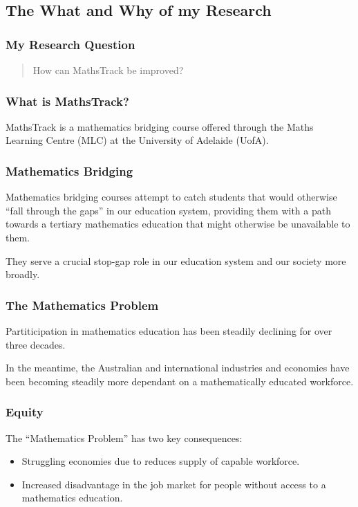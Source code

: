 \documentclass[14pt]{beamer}
\begin{document}
\subsection{The What and Why of my Research}

\begin{frame}
\frametitle{My Research Question}
\begin{quote}
	How can MathsTrack be improved?
\end{quote}
\end{frame}

\begin{frame}
\frametitle{What is MathsTrack?}
MathsTrack is a mathematics bridging course offered through the Maths Learning Centre (MLC) at the University of Adelaide (UofA).
\end{frame}

\begin{frame}
\frametitle{Mathematics Bridging}
Mathematics bridging courses attempt to catch students that would otherwise ``fall through the gaps'' in our education system, providing them with a path towards a tertiary mathematics education that might otherwise be unavailable to them.

They serve a crucial stop-gap role in our education system and our society more broadly.
\end{frame}

\begin{frame}
\frametitle{The Mathematics Problem}
Partiticipation in mathematics education has been steadily declining for over three decades.

In the meantime, the Australian and international industries and economies have been becoming steadily more dependant on a mathematically educated workforce.
\end{frame}

\begin{frame}
\frametitle{Equity}
The ``Mathematics Problem'' has two key consequences:
\begin{itemize}
	\item Struggling economies due to reduces supply of capable workforce.
	\item Increased disadvantage in the job market for people without access to a mathematics education.
\end{itemize}
\end{frame}
\end{document}
